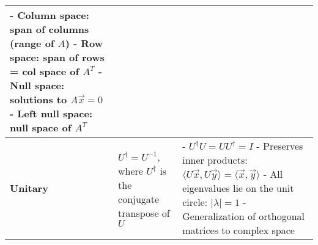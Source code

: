 \documentclass[12pt]{article}
\begin{document}
\begin{longtable}{|>{\bfseries}m{3.5cm}|m{5cm}|m{10.5cm}|}
		- Column space: span of columns (range of $A$) \newline
		- Row space: span of rows = col space of $A^T$ \newline
		- Null space: solutions to $A\vec{x} = 0$ \newline
		- Left null space: null space of $A^T$ \\
		\hline
		Unitary & $U^\dagger = U^{-1}$, where $U^\dagger$ is the conjugate
		transpose of $U$ &
		- $U^\dagger U = U U^\dagger = I$ \newline
		- Preserves inner products: $\langle U\vec{x}, U\vec{y} \rangle =
		\langle \vec{x}, \vec{y} \rangle$ \newline
		- All eigenvalues lie on the unit circle: $|\lambda| = 1$ \newline
		- Generalization of orthogonal matrices to complex space \\
		\hline

\end{longtable}
\end{document}
